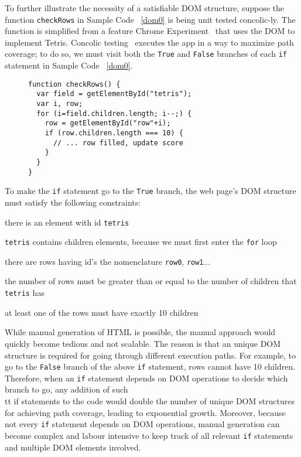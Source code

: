 To further illustrate the necessity of a satisfiable DOM structure, suppose the function {\tt checkRows} in Sample Code ~\ref{dom0} is being unit tested concolic-ly.  
The function is simplified from a feature Chrome Experiment~\cite{domtris} that uses the DOM to implement Tetris.  
Concolic testing~\cite{cute} executes the app in a way to maximize path coverage; to do so, we must visit both the {\tt True} and {\tt False} branches of each {\tt if} statement in Sample Code ~\ref{dom0}.
\begin{figure}
\begin{lstlisting}[caption=Example that needs tracing and solver. The function getElementById() is equivalent to document.getElementById(),label=dom0]
function checkRows() {
  var field = getElementById("tetris"); 
  var i, row;
  for (i=field.children.length; i--;) {
    row = getElementById("row"+i);
    if (row.children.length === 10) {
      // ... row filled, update score
    }
  }
}
\end{lstlisting}
\end{figure}

To make the {\tt if} statement go to the {\tt True} branch, the web page's DOM structure must satisfy the following constraints:
\begin {compactitem}
\item there is an element with id {\tt tetris}
\item {\tt tetris} contains children elements, because we must first enter the {\tt for} loop
\item there are rows having id's the nomenclature {\tt row0}, {\tt row1}...
\item the number of rows must be greater than or equal to the number of children that {\tt tetris} has
\item at least one of the rows must have exactly 10 children
\end {compactitem}

While manual generation of HTML is possible, the manual approach would quickly become tedious and not scalable.  
The reason is that an unique DOM structure is required for going through different execution paths.  
For example, to go to the {\tt False} branch of the above {\tt if} statement, rows cannot have 10 children.
Therefore, when an {\tt if} statement depends on DOM operations to decide which branch to go, any addition of such {\\tt if} statements to the code would double the number of unique DOM structures for achieving path coverage, leading to exponential growth.
Moreover, because not every {\tt if} statement depends on DOM operations, manual generation can become complex and labour intensive to keep track of all relevant {\tt if} statements and multiple DOM elements involved.



